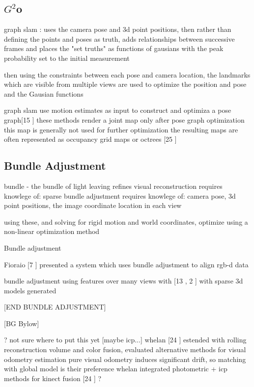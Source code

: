 
\subsection{$G^2$o}

graph slam : uses the camera pose and 3d point positions, then rather than defining the points and poses as truth, adds relationships between successive frames and places the "set truths" as functions of gausians with the peak probability set to the initial measurement

then using the constraints between each pose and camera location, the landmarks which are visible from multiple views are used to optimize the position and pose and the Gausian functions

graph slam use motion estimates as input to construct and optimiza a pose graph[15 \cite{Kummerle11G}] these methods render a joint map only after pose graph optimization
this map is generally not used for further optimization
the resulting maps are often represented as occupancy grid maps or octrees [25 \cite{Wurm10Octomap}]




\subsection{Bundle Adjustment}

bundle - the bundle of light leaving 
refines visual reconstruction
requires knowlege of:
sparse bundle adjustment requires knowlege of:
camera pose, 3d point positions, the image coordinate location in each view

using these, and solving for rigid motion and world coordinates, optimize using a non-linear optimization method

Bundle adjustment \cite{Lourakis09Sba}

Fioraio [7 \cite{Fioraio11Realtime}] presented a system which uses bundle adjustment to align rgb-d data


bundle adjustment using features over many views with [13 \cite{Klein07Parallel} , 2 \cite{Agarwal09Building}] with sparse 3d models generated

[END BUNDLE ADJUSTMENT]



[BG Bylow]

? not sure where to put this yet [maybe icp...]
whelan [24 \cite{Whelan13Robust}] estended with rolling reconstruction volume and color fusion, evaluated alternative methods for visual odometry estimation
pure visual odometry induces significant drift, so matching with global model is their preference
whelan integrated photometric + icp methods for kinect fusion [24 \cite{Whelan13Robust}]
?






